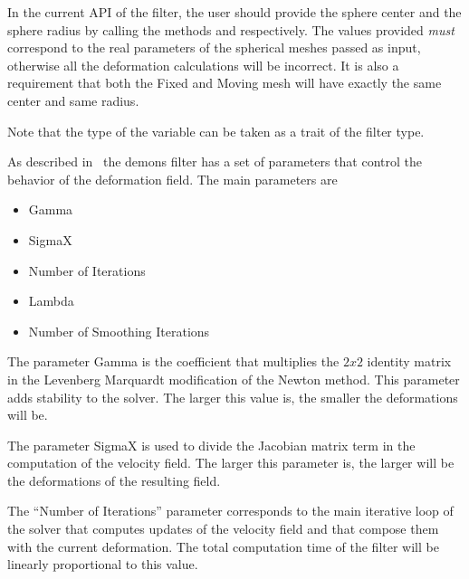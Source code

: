 \documentclass{InsightArticle}
\begin{document}
In the current API of the filter, the user should provide the sphere center and
the sphere radius by calling the methods  and
 respectively. The values provided \emph{must} correspond to
the real parameters of the spherical meshes passed as input, otherwise all the
deformation calculations will be incorrect. It is also a requirement that both
the Fixed and Moving mesh will have exactly the same center and same radius.

\begin{center}

\end{center}

Note that the type of the  variable can be taken as a trait of the
filter type.
 
\begin{center}

\end{center}

As described in~\cite{Yeo2008,Yeo2009} the demons filter has a set of
parameters that control the behavior of the deformation field. The main
parameters are

\begin{itemize}
\item Gamma
\item SigmaX
\item Number of Iterations
\item Lambda
\item Number of Smoothing Iterations
\end{itemize}

The parameter Gamma is the coefficient that multiplies the $2x2$ identity
matrix in the Levenberg Marquardt modification of the Newton method. This
parameter adds stability to the solver. The larger this value is, the smaller
the deformations will be.

The parameter SigmaX is used to divide the Jacobian matrix term in the
computation of the velocity field. The larger this parameter is, the larger
will be the deformations of the resulting field.

The ``Number of Iterations'' parameter corresponds to the main iterative loop
of the solver that computes updates of the velocity field and that compose them
with the current deformation. The total computation time of the filter will be
linearly proportional to this value.
\end{document}
